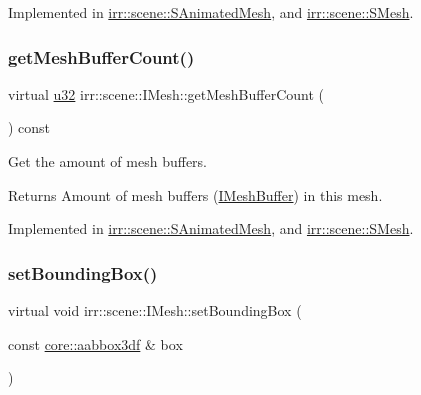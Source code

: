 Implemented in \hyperlink{structirr_1_1scene_1_1SAnimatedMesh_a3c010c881f315e56a05f40632f3c7f79}{irr\+::scene\+::\+S\+Animated\+Mesh}, and \hyperlink{structirr_1_1scene_1_1SMesh_a768eeba9148e949d6962bee08517a056}{irr\+::scene\+::\+S\+Mesh}.

\mbox{\label{classirr_1_1scene_1_1IMesh_a2ebed0bdae2d6537c36b0b7ac831edb8}} 
\subsubsection{\texorpdfstring{get\+Mesh\+Buffer\+Count()}{getMeshBufferCount()}}
{\footnotesize\ttfamily virtual \hyperlink{namespaceirr_a0416a53257075833e7002efd0a18e804}{u32} irr\+::scene\+::\+I\+Mesh\+::get\+Mesh\+Buffer\+Count (\begin{DoxyParamCaption}{ }\end{DoxyParamCaption}) const\hspace{0.3cm}{\ttfamily [pure virtual]}}



Get the amount of mesh buffers. 

\begin{DoxyReturn}{Returns}
Amount of mesh buffers (\hyperlink{classirr_1_1scene_1_1IMeshBuffer}{I\+Mesh\+Buffer}) in this mesh. 
\end{DoxyReturn}


Implemented in \hyperlink{structirr_1_1scene_1_1SAnimatedMesh_a01dd8fd3ea4a53af90599697cd34ea01}{irr\+::scene\+::\+S\+Animated\+Mesh}, and \hyperlink{structirr_1_1scene_1_1SMesh_a08f677a62f8e3770af70293c8043fff4}{irr\+::scene\+::\+S\+Mesh}.

\mbox{\label{classirr_1_1scene_1_1IMesh_a0aee3b5bc5d31ce996becc069f65e642}} 
\subsubsection{\texorpdfstring{set\+Bounding\+Box()}{setBoundingBox()}}
{\footnotesize\ttfamily virtual void irr\+::scene\+::\+I\+Mesh\+::set\+Bounding\+Box (\begin{DoxyParamCaption}\item[{const \hyperlink{namespaceirr_1_1core_adfc8fa01b30044c55f3332a1d6c1aa19}{core\+::aabbox3df} \&}]{box }\end{DoxyParamCaption})\hspace{0.3cm}{\ttfamily [pure virtual]}}



